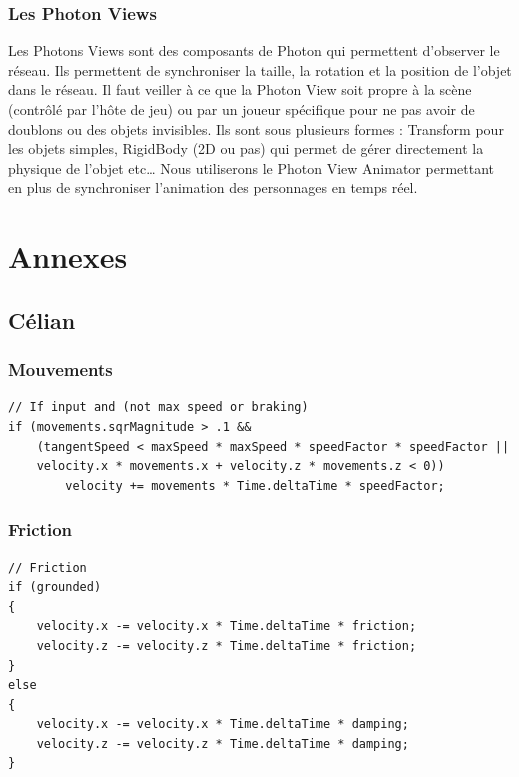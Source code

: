 \documentclass{article}
\begin{document}
\subsubsection{Les Photon Views}

Les Photons Views sont des composants de Photon qui permettent d’observer le réseau. Ils permettent de synchroniser la taille, la rotation et la position de l’objet dans le réseau. Il faut veiller à ce que la Photon View soit propre à la scène (contrôlé par l’hôte de jeu) ou par un joueur spécifique pour ne pas avoir de doublons ou des objets invisibles.
Ils sont sous plusieurs formes : Transform pour les objets simples, RigidBody (2D ou pas) qui permet de gérer directement la physique de l’objet etc… Nous utiliserons le Photon View Animator permettant en plus de synchroniser l’animation des personnages en temps réel.


\newpage
\section{Annexes}


\subsection{Célian}
\subsubsection{Mouvements}
\label{Mouvements}
\begin{lstlisting}
// If input and (not max speed or braking)
if (movements.sqrMagnitude > .1 &&
    (tangentSpeed < maxSpeed * maxSpeed * speedFactor * speedFactor ||
    velocity.x * movements.x + velocity.z * movements.z < 0))
        velocity += movements * Time.deltaTime * speedFactor;
\end{lstlisting}

\subsubsection{Friction}
\label{Friction}
\begin{lstlisting}
// Friction
if (grounded)
{
    velocity.x -= velocity.x * Time.deltaTime * friction;
    velocity.z -= velocity.z * Time.deltaTime * friction;
}
else
{
    velocity.x -= velocity.x * Time.deltaTime * damping;
    velocity.z -= velocity.z * Time.deltaTime * damping;
}
\end{lstlisting}
\end{document}
